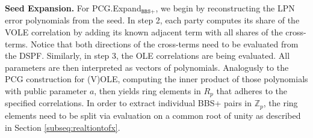 \textbf{Seed Expansion.} For PCG.Expand$_{\texttt{BBS+}}$, we begin by reconstructing the LPN error polynomials from the seed. In step 2, each party computes its share of the VOLE correlation by adding its known adjacent term with all shares of the cross-terms. Notice that both directions of the cross-terms need to be evaluated from the DSPF. Similarly, in step 3, the OLE correlations are being evaluated. All parameters are then interpreted as vectors of polynomials. Analogusly to the PCG construction for (V)OLE, computing the inner product of those polynomials with public parameter $a$, then yields ring elements in $R_p$ that adheres to the specified correlations. In order to extract individual BBS+ pairs in $\mathbb{Z}_{p}$, the ring elements need to be split via evaluation on a common root of unity as described in Section \ref{subseq:realtiontofx}.

